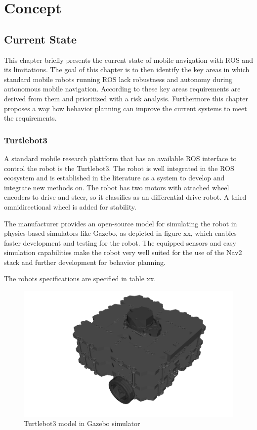 \chapter{Concept}
\label{cha:methoden}


\section{Current State}
This chapter briefly presents the current state of mobile navigation with ROS and its limitations. 
The goal of this chapter is to then identify the key areas in which standard mobile robots running ROS lack robustness and autonomy during autonomous mobile navigation. According to these key areas requirements are derived from them and prioritized with a risk analysis. 
Furthermore this chapter proposes a way how behavior planning can improve the current systems to meet the requirements. 


\subsection{Turtlebot3}
A standard mobile research plattform that has an available ROS interface to control the robot is the Turtlebot3. The robot is well integrated in the ROS ecosystem and is established in the literature as a system to develop and integrate new methods on. 
The robot has two motors with attached wheel encoders to drive and steer, so it classifies as an differential drive robot. A third omnidirectional wheel is added for stability. 

The manufacturer provides an open-source model for simulating the robot in physics-based simulators like Gazebo, as depicted in figure xx, which enables faster development and testing for the robot. 
The equipped sensors and easy simulation capabilities make the robot very well suited for the use of the Nav2 stack and further development for behavior planning. 

The robots specifications are specified in table xx. 

\begin{figure}[h!]
	\includegraphics[width=1.0\textwidth]{images/turtlebot_sim.png}
	\caption{Turtlebot3 model in Gazebo simulator}
\end{figure}

